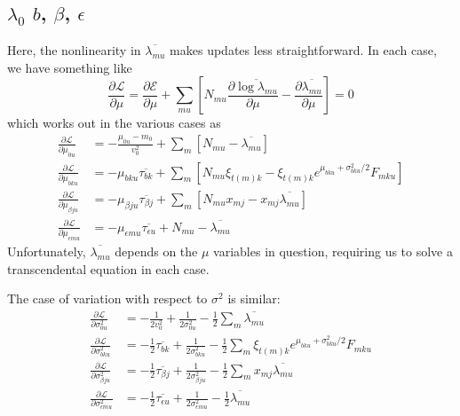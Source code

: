 \documentclass[11pt]{article}
\begin{document}
\subsection{$\lambda_0$ $b$, $\beta$, $\epsilon$}
Here, the nonlinearity in $\overline{\lambda_{mu}}$ makes updates less straightforward. In each case, we have something like
\begin{equation}
    \frac{\partial\mathcal{L}}{\partial \mu} = \frac{\partial\mathcal{E}}{\partial \mu} + \sum_{mu} \left[N_{mu} \frac{\partial\overline{\log \lambda_{mu}}}{\partial \mu} - \frac{\partial\overline{\lambda_{mu}}}{\partial \mu}\right] = 0
\end{equation}
which works out in the various cases as
\begin{align}
    \frac{\partial\mathcal{L}}{\partial \mu_{0u}} &= -\frac{\mu_{0u} - m_0}{v_0^2} + \sum_m [N_{mu} - \overline{\lambda_{mu}}] \\
    \frac{\partial\mathcal{L}}{\partial \mu_{bku}} &= 
    - \mu_{bku} \overline{\tau_{bk}} + \sum_m [N_{mu} \xi_{t(m) k} - 
    \xi_{t(m)k} e^{\mu_{bku} + \sigma^2_{bku} / 2} F_{mku} ] \\
    \frac{\partial\mathcal{L}}{\partial \mu_{\beta ju}} &= 
    - \mu_{\beta ju} \overline{\tau_{\beta j}} + \sum_m [N_{mu} x_{mj} - 
    x_{mj} \overline{\lambda_{mu}}] \\
    \frac{\partial\mathcal{L}}{\partial \mu_{\epsilon mu}} &= 
    - \mu_{\epsilon mu} \overline{\tau_{\epsilon u}} + N_{mu} - 
    \overline{\lambda_{mu}}
\end{align}
Unfortunately, $\overline{\lambda_{mu}}$ depends on the $\mu$ variables in question, requiring us to solve a transcendental equation in each case.

The case of variation with respect to $\sigma^2$ is similar:
\begin{align}
    \frac{\partial\mathcal{L}}{\partial \sigma^2_{0u}} &= -\frac{1}{2v_0^2} + \frac{1}{2\sigma^2_{0u}} - \frac{1}{2} \sum_m \overline{\lambda_{mu}} \\
    \frac{\partial\mathcal{L}}{\partial \sigma^2_{bku}} &= 
    - \frac{1}{2} \overline{\tau_{bk}} + \frac{1}{2\sigma^2_{bku}} - \frac{1}{2}\sum_m \xi_{t(m)k} e^{\mu_{bku} + \sigma^2_{bku} / 2} F_{mku}  \\
    \frac{\partial\mathcal{L}}{\partial \sigma^2_{\beta ju}} &= 
    - \frac{1}{2} \overline{\tau_{\beta j}} + \frac{1}{2\sigma^2_{\beta ju}} - \frac{1}{2} \sum_m x_{mj} \overline{\lambda_{mu}} \\
    \frac{\partial\mathcal{L}}{\partial \sigma^2_{\epsilon mu}} &= 
    -\frac{1}{2} \overline{\tau_{\epsilon u}} + \frac{1}{2\sigma^2_{\epsilon mu}} - \frac{1}{2} \overline{\lambda_{mu}}
\end{align}
\end{document}
